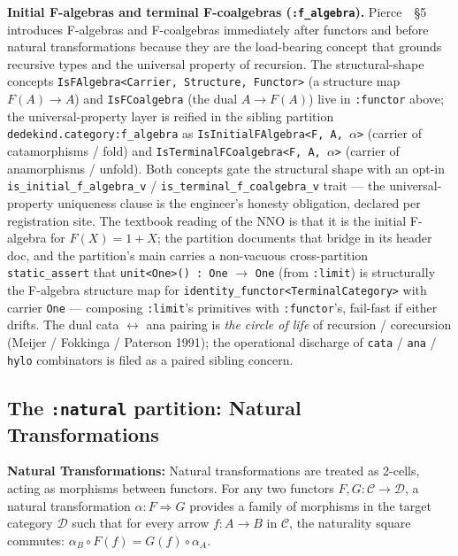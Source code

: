 \documentclass[11pt, a4paper]{report}
\begin{document}
\textbf{Initial F-algebras and terminal F-coalgebras (\texttt{:f\_algebra}).} Pierce~\cite{pierce1991basic}~\S5 introduces F-algebras and F-coalgebras immediately after functors and before natural transformations because they are the load-bearing concept that grounds recursive types and the universal property of recursion. The structural-shape concepts \texttt{IsFAlgebra<Carrier, Structure, Functor>} (a structure map $F(A) \to A$) and \texttt{IsFCoalgebra} (the dual $A \to F(A)$) live in \texttt{:functor} above; the universal-property layer is reified in the sibling partition \texttt{dedekind.category:f\_algebra} as \texttt{IsInitialFAlgebra<F, A, $\alpha$>} (carrier of catamorphisms / fold) and \texttt{IsTerminalFCoalgebra<F, A, $\alpha$>} (carrier of anamorphisms / unfold). Both concepts gate the structural shape with an opt-in \texttt{is\_initial\_f\_algebra\_v} / \texttt{is\_terminal\_f\_coalgebra\_v} trait --- the universal-property uniqueness clause is the engineer's honesty obligation, declared per registration site. The textbook reading of the NNO is that it is the initial F-algebra for $F(X) = 1 + X$; the partition documents that bridge in its header doc, and the partition's main carries a non-vacuous cross-partition \texttt{static\_assert} that \texttt{unit<One>() : One} $\to$ \texttt{One} (from \texttt{:limit}) is structurally the F-algebra structure map for \texttt{identity\_functor<TerminalCategory>} with carrier \texttt{One} --- composing \texttt{:limit}'s primitives with \texttt{:functor}'s, fail-fast if either drifts. The dual cata $\leftrightarrow$ ana pairing is \emph{the circle of life} of recursion / corecursion (Meijer / Fokkinga / Paterson 1991); the operational discharge of \texttt{cata} / \texttt{ana} / \texttt{hylo} combinators is filed as a paired sibling concern.

\subsection{The \texttt{:natural} partition: Natural Transformations}

\textbf{Natural Transformations:} Natural transformations are treated as 2-cells, acting as morphisms between functors. For any two functors $F, G: \mathcal{C} \to \mathcal{D}$, a natural transformation $\alpha: F \Rightarrow G$ provides a family of morphisms in the target category $\mathcal{D}$ such that for every arrow $f: A \to B$ in $\mathcal{C}$, the naturality square commutes: $\alpha_B \circ F(f) = G(f) \circ \alpha_A$.
\end{document}
